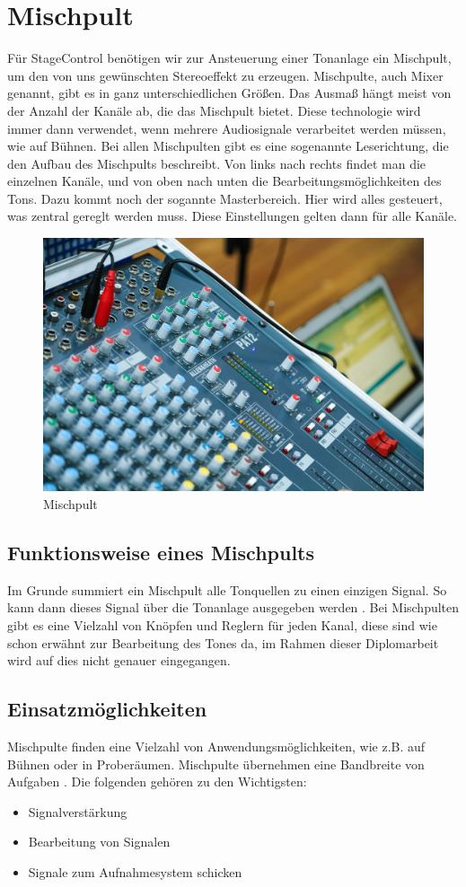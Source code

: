 \section{Mischpult}
Für StageControl benötigen wir zur Ansteuerung einer Tonanlage ein Mischpult, um den von uns gewünschten Stereoeffekt zu erzeugen. Mischpulte, auch Mixer genannt, gibt es in ganz unterschiedlichen Größen. Das Ausmaß hängt meist von der Anzahl der Kanäle ab, die das Mischpult bietet. Diese technologie wird immer dann verwendet, wenn mehrere Audiosignale verarbeitet werden müssen, wie auf Bühnen. \parencite{MischpultInformation} Bei allen Mischpulten gibt es eine sogenannte Leserichtung, die den Aufbau des Mischpults beschreibt. Von links nach rechts findet man die einzelnen Kanäle, und von oben nach unten die Bearbeitungsmöglichkeiten des Tons. Dazu kommt noch der sogannte Masterbereich. Hier wird alles gesteuert, was zentral gereglt werden muss. Diese Einstellungen gelten dann für alle Kanäle.  \parencite{MischpultMaster} \\


\begin{figure}[H]
	\centering
	\includegraphics[width=0.6\linewidth]{images/mischpult.jpg}
	\caption[Mischpult]{Mischpult}
	\label{fig:Mischpult}
\end{figure}

\subsection{Funktionsweise eines Mischpults}
Im Grunde summiert ein Mischpult alle Tonquellen zu einen einzigen Signal. So kann dann dieses Signal über die Tonanlage ausgegeben werden \parencite{MischpultErklaerung}. Bei Mischpulten gibt es eine Vielzahl von Knöpfen und Reglern für jeden Kanal, diese sind wie schon erwähnt zur Bearbeitung des Tones da, im Rahmen dieser Diplomarbeit wird auf dies nicht genauer eingegangen. \\


\subsection{Einsatzmöglichkeiten}
Mischpulte finden eine Vielzahl von Anwendungsmöglichkeiten, wie z.B. auf Bühnen oder in Proberäumen. Mischpulte übernehmen eine Bandbreite von Aufgaben \parencite{MischpultVerwendungszweck}. Die folgenden gehören zu den Wichtigsten:
\begin{itemize}
	\item Signalverstärkung
	\item Bearbeitung von Signalen
	\item Signale zum Aufnahmesystem schicken
\end{itemize}


